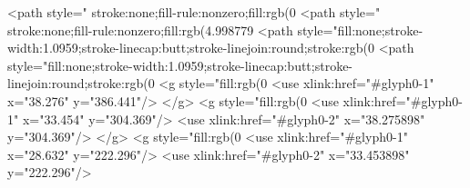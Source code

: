 <path style=" stroke:none;fill-rule:nonzero;fill:rgb(0%
<path style=" stroke:none;fill-rule:nonzero;fill:rgb(4.998779%
<path style="fill:none;stroke-width:1.0959;stroke-linecap:butt;stroke-linejoin:round;stroke:rgb(0%
<path style="fill:none;stroke-width:1.0959;stroke-linecap:butt;stroke-linejoin:round;stroke:rgb(0%
<g style="fill:rgb(0%
  <use xlink:href="#glyph0-1" x="38.276" y="386.441"/>
</g>
<g style="fill:rgb(0%
  <use xlink:href="#glyph0-1" x="33.454" y="304.369"/>
  <use xlink:href="#glyph0-2" x="38.275898" y="304.369"/>
</g>
<g style="fill:rgb(0%
  <use xlink:href="#glyph0-1" x="28.632" y="222.296"/>
  <use xlink:href="#glyph0-2" x="33.453898" y="222.296"/>
